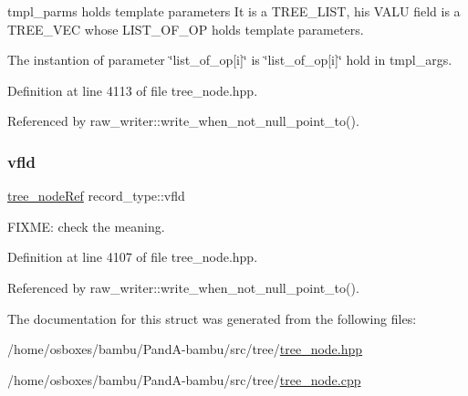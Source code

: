 tmpl\+\_\+parms holds template parameters It is a T\+R\+E\+E\+\_\+\+L\+I\+ST, his V\+A\+LU field is a T\+R\+E\+E\+\_\+\+V\+EC whose L\+I\+S\+T\+\_\+\+O\+F\+\_\+\+OP holds template parameters. 

The instantion of parameter \char`\"{}list\+\_\+of\+\_\+op\mbox{[}i\mbox{]}\char`\"{} is \char`\"{}list\+\_\+of\+\_\+op\mbox{[}i\mbox{]}\char`\"{} hold in tmpl\+\_\+args. 

Definition at line 4113 of file tree\+\_\+node.\+hpp.



Referenced by raw\+\_\+writer\+::write\+\_\+when\+\_\+not\+\_\+null\+\_\+point\+\_\+to().

\mbox{\label{structrecord__type_a6fa6730c5f59752e895c7c8371edc96b}} 
\subsubsection{\texorpdfstring{vfld}{vfld}}
{\footnotesize\ttfamily \hyperlink{tree__node_8hpp_a6ee377554d1c4871ad66a337eaa67fd5}{tree\+\_\+node\+Ref} record\+\_\+type\+::vfld}



F\+I\+X\+ME\+: check the meaning. 



Definition at line 4107 of file tree\+\_\+node.\+hpp.



Referenced by raw\+\_\+writer\+::write\+\_\+when\+\_\+not\+\_\+null\+\_\+point\+\_\+to().



The documentation for this struct was generated from the following files\+:\begin{DoxyCompactItemize}
\item 
/home/osboxes/bambu/\+Pand\+A-\/bambu/src/tree/\hyperlink{tree__node_8hpp}{tree\+\_\+node.\+hpp}\item 
/home/osboxes/bambu/\+Pand\+A-\/bambu/src/tree/\hyperlink{tree__node_8cpp}{tree\+\_\+node.\+cpp}\end{DoxyCompactItemize}
